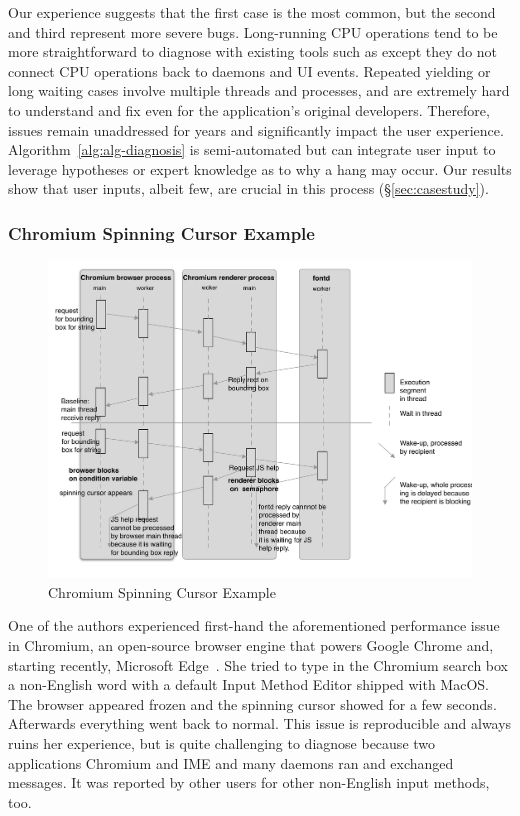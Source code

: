 \noindent
Our experience suggests that the first case is the most common, but the
second and third represent more severe bugs. Long-running CPU operations tend to
be more straightforward to diagnose with existing tools such as \spindump except
they do not connect CPU operations back to daemons and UI events. Repeated yielding or
long waiting cases involve multiple threads and processes, and are extremely
hard to understand and fix even for the application's original developers.
Therefore, issues remain unaddressed for years and significantly impact the
user experience. Algorithm~\ref{alg:alg-diagnosis} is semi-automated but can
integrate user input to leverage hypotheses or expert knowledge
as to why a hang may occur. Our results show that user inputs, albeit few, are
crucial in this process (\S\ref{sec:casestudy}).

\subsubsection{Chromium Spinning Cursor Example}

\begin{figure}[tb]
	\footnotesize
    \centering
	\includegraphics[width=\columnwidth]{./figures/chromium_case_study_2.pdf}
    \caption{Chromium Spinning Cursor Example}
    \label{fig:chromium-case-study}
\end{figure}

One of the authors experienced first-hand the aforementioned performance issue
in Chromium, an open-source browser engine that powers Google Chrome and,
starting recently, Microsoft Edge~\cite{chromiumurl}. She tried to type in
the Chromium search box a non-English word with a default Input Method Editor
shipped with MacOS. The browser appeared frozen and the spinning cursor showed
for a few seconds. Afterwards everything went back to normal. This issue is
reproducible and always ruins her experience, but is quite challenging to
diagnose because two applications Chromium and IME and many daemons ran and
exchanged messages. It was reported by other users for other non-English input
methods, too.

